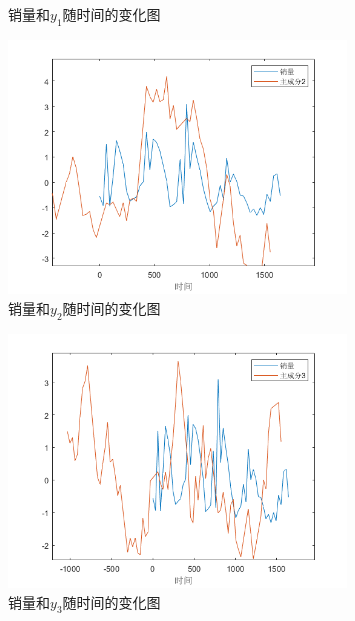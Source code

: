 \documentclass{cumcm}
\begin{document}
\begin{enumerate}
\begin{figure}[H]
\begin{minipage}[t]{0.5\linewidth}
		  \caption{销量和$y_1$随时间的变化图}   
		  \label{fig:pca1_sales}   
		\end{minipage}   
		 \begin{minipage}[t]{0.5\linewidth} %
			\centering   
			\includegraphics[width=0.8\textwidth]{img_backup/pca2-sales.png}   
			\caption{销量和$y_2$随时间的变化图}   
			\label{fig:pca2_sales.png}
		  \end{minipage} 
	  \end{figure}
	  \begin{figure}[H]
		\begin{minipage}[t]{0.5\linewidth}   
		  \centering   
		  \includegraphics[width=0.8\textwidth]{img_backup/pca3-sales.png}   
		  \caption{销量和$y_3$随时间的变化图}   
		  \label{fig:pca3_sales}   
		\end{minipage}   
		 \begin{minipage}[t]{0.5\linewidth} %
			\centering   

\end{minipage}
\end{figure}
\end{enumerate}
\end{document}
